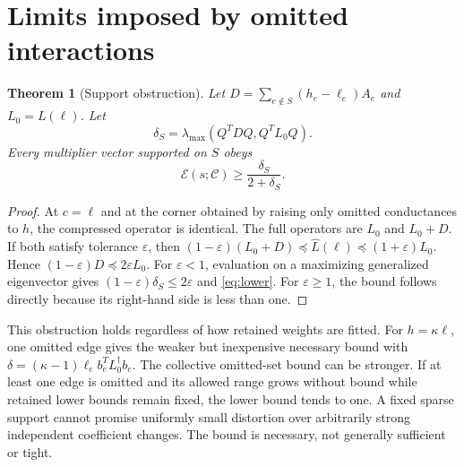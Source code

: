 \documentclass[11pt]{article}
\newtheorem{theorem}{Theorem}
\newcommand{\eps}{\varepsilon}
\newcommand{\Lo}{\widehat L}
\begin{document}
\section{Limits imposed by omitted interactions}
\begin{theorem}[Support obstruction]\label{thm:omit}
Let $D=\sum_{e\notin S}(h_e-\ell_e)A_e$ and $L_0=L(\ell)$. Let
\begin{equation}
\delta_S=\lambda_{\max}(Q^TDQ,Q^TL_0Q).
\end{equation}
Every multiplier vector supported on $S$ obeys
\begin{equation}\label{eq:lower}
\mathcal E(s;\mathcal C)\ge\frac{\delta_S}{2+\delta_S}.
\end{equation}
\end{theorem}
\begin{proof}
At $c=\ell$ and at the corner obtained by raising only omitted conductances to $h$, the compressed operator is identical. The full operators are $L_0$ and $L_0+D$. If both satisfy tolerance $\eps$, then
$(1-\eps)(L_0+D)\preceq\Lo(\ell)\preceq(1+\eps)L_0$.
Hence $(1-\eps)D\preceq2\eps L_0$. For $\eps<1$, evaluation on a maximizing generalized eigenvector gives $(1-\eps)\delta_S\le2\eps$ and \eqref{eq:lower}. For $\eps\ge1$, the bound follows directly because its right-hand side is less than one.
\end{proof}

This obstruction holds regardless of how retained weights are fitted. For $h=\kappa\ell$, one omitted edge gives the weaker but inexpensive necessary bound with $\delta=(\kappa-1)\ell_e b_e^TL_0^\dagger b_e$. The collective omitted-set bound can be stronger. If at least one edge is omitted and its allowed range grows without bound while retained lower bounds remain fixed, the lower bound tends to one. A fixed sparse support cannot promise uniformly small distortion over arbitrarily strong independent coefficient changes. The bound is necessary, not generally sufficient or tight.
\end{document}
